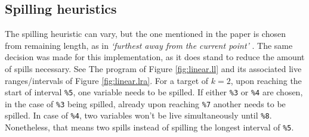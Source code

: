 \documentclass{article}
\begin{document}

\subsection{Spilling heuristics}
The spilling heuristic can vary, but the one mentioned in the paper is chosen from remaining length, as in  \textit{\textquoteleft furthest away from the current point\textquoteright} \cite[900]{linear}. The same decision was made for this implementation, as it does stand to reduce the amount of spills necessary. See The program of Figure \ref{fig:linear.ll} and its associated live ranges/intervals of Figure \ref{fig:linear.lra}. For a target of \(k=2\), upon reaching the start of interval \texttt{\%5},  one variable needs to be spilled. If either \texttt{\%3} or \texttt{\%4} are chosen, in the case of \texttt{\%3} being spilled, already upon reaching \texttt{\%7} another needs to be spilled. In case of \texttt{\%4}, two variables won't be live simultaneously until \texttt{\%8}. Nonetheless, that means two spills instead of spilling the longest interval of \texttt{\%5}.
\usetikzlibrary{chains,arrows}
\end{document}
